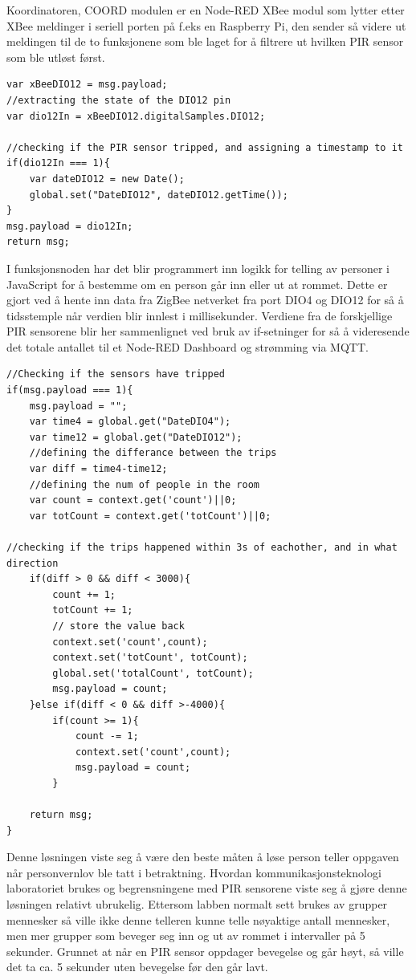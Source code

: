 \documentclass{article}
\begin{document}
Koordinatoren, COORD modulen er en Node-RED XBee modul som lytter etter XBee meldinger i seriell porten på f.eks en Raspberry Pi, den sender så videre ut meldingen til de to funksjonene som ble laget for å filtrere ut hvilken PIR sensor som ble utløst først.

\begin{lstlisting}[caption=dio12/4 node funksjon]
var xBeeDIO12 = msg.payload;
//extracting the state of the DIO12 pin
var dio12In = xBeeDIO12.digitalSamples.DIO12;
 
//checking if the PIR sensor tripped, and assigning a timestamp to it
if(dio12In === 1){
	var dateDIO12 = new Date();
	global.set("DateDIO12", dateDIO12.getTime());
}
msg.payload = dio12In;
return msg;
\end{lstlisting}
I funksjonsnoden har det blir programmert inn logikk for telling av personer i JavaScript for å bestemme om en person går inn eller ut at rommet. Dette er gjort ved å hente inn data fra ZigBee netverket fra port DIO4 og DIO12 for så å tidsstemple når verdien blir innlest i millisekunder. Verdiene fra de forskjellige PIR sensorene blir her sammenlignet ved bruk av if-setninger for så å videresende det totale antallet til et Node-RED Dashboard og strømming via MQTT.
\begin{lstlisting}[caption=Counter node funksjon]
//Checking if the sensors have tripped
if(msg.payload === 1){
	msg.payload = "";
	var time4 = global.get("DateDIO4");
	var time12 = global.get("DateDIO12");
	//defining the differance between the trips
	var diff = time4-time12;
	//defining the num of people in the room
	var count = context.get('count')||0;
	var totCount = context.get('totCount')||0;
	
//checking if the trips happened within 3s of eachother, and in what direction
	if(diff > 0 && diff < 3000){
    	count += 1;
    	totCount += 1;
    	// store the value back
    	context.set('count',count);
    	context.set('totCount', totCount);
    	global.set('totalCount', totCount);
    	msg.payload = count;
	}else if(diff < 0 && diff >-4000){
    	if(count >= 1){
        	count -= 1;
        	context.set('count',count);
        	msg.payload = count;
    	}
    	
	return msg;
}
\end{lstlisting}

Denne løsningen viste seg å være den beste måten å løse person teller oppgaven når personvernlov ble tatt i betraktning. Hvordan kommunikasjonsteknologi laboratoriet brukes og begrensningene med PIR sensorene viste seg å gjøre denne løsningen relativt ubrukelig. Ettersom labben normalt sett brukes av grupper mennesker så ville ikke denne telleren kunne telle nøyaktige antall mennesker, men mer grupper som beveger seg inn og ut av rommet i intervaller på 5 sekunder. Grunnet at når en PIR sensor oppdager bevegelse og går høyt, så ville det ta ca. 5 sekunder uten bevegelse før den går lavt. 
\end{document}
